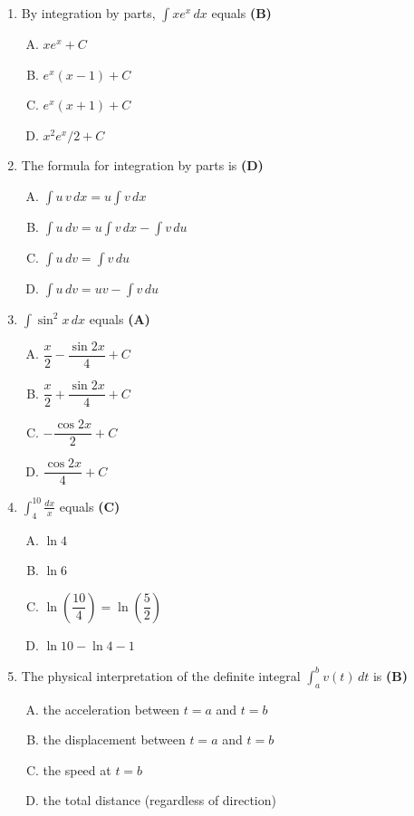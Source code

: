 \documentclass[10pt,a4paper]{article}
\begin{document}
\begin{enumerate}[1.]
\item By integration by parts, $\displaystyle\int x e^x\,dx$ equals \hfill \textbf{(B)}
\begin{enumerate}[(A)]
    \item $x e^x + C$
    \item $e^x(x-1) + C$
    \item $e^x(x+1) + C$
    \item $x^2 e^x/2 + C$
\end{enumerate}

\item The formula for integration by parts is \hfill \textbf{(D)}
\begin{enumerate}[(A)]
    \item $\displaystyle\int u\,v\,dx = u\displaystyle\int v\,dx$
    \item $\displaystyle\int u\,dv = u\displaystyle\int v\,dx - \displaystyle\int v\,du$
    \item $\displaystyle\int u\,dv = \displaystyle\int v\,du$
    \item $\displaystyle\int u\,dv = uv - \displaystyle\int v\,du$
\end{enumerate}

\item $\displaystyle\int \sin^2 x\,dx$ equals \hfill \textbf{(A)}
\begin{enumerate}[(A)]
    \item $\dfrac{x}{2} - \dfrac{\sin 2x}{4} + C$
    \item $\dfrac{x}{2} + \dfrac{\sin 2x}{4} + C$
    \item $-\dfrac{\cos 2x}{2} + C$
    \item $\dfrac{\cos 2x}{4} + C$
\end{enumerate}

\item $\displaystyle\int_4^{10} \frac{dx}{x}$ equals \hfill \textbf{(C)}
\begin{enumerate}[(A)]
    \item $\ln 4$
    \item $\ln 6$
    \item $\ln\!\left(\dfrac{10}{4}\right) = \ln\!\left(\dfrac{5}{2}\right)$
    \item $\ln 10 - \ln 4 - 1$
\end{enumerate}

\item The physical interpretation of the definite integral $\displaystyle\int_a^b v(t)\,dt$ is \hfill \textbf{(B)}
\begin{enumerate}[(A)]
    \item the acceleration between $t=a$ and $t=b$
    \item the displacement between $t=a$ and $t=b$
    \item the speed at $t=b$
    \item the total distance (regardless of direction)
\end{enumerate}


\end{enumerate}
\end{document}
